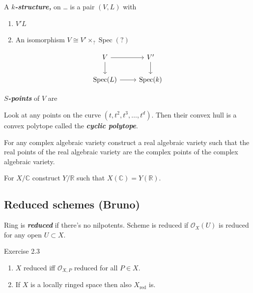 \begin{defn}\leavevmode
	A \textit{\textbf{$k$-structure,}} on … is a pair $(V,L)$ with
	 \begin{enumerate}
		\item $V'L$
	
		\item An isomorphism $V\cong V'\times_?\operatorname{Spec}(?)$
	\end{enumerate}
	\[\begin{tikzcd}
		V\arrow[r]\arrow[d]&V'\arrow[d]\\
		\operatorname{Spec}(L)\arrow[r]&\operatorname{Spec}(k)
	\end{tikzcd}\]
\end{defn}

\begin{defn}\leavevmode
	 \textit{\textbf{$S$-points}} of $V$ are 
\end{defn}

\begin{exercise}\leavevmode
	Look at any points on the curve $(t,t^2,t^3,\ldots,t^d)$. Then their convex hull is a convex polytope called the \textit{\textbf{cyclic polytope}}.
\end{exercise}

\begin{exercise}\leavevmode
	For any complex algebraic variety construct a real algebraic variety such that the real points of the real algebraic variety are the complex points of the complex algebraic variety.

	For $X/\mathbb{C}$ construct $Y/\mathbb{R}$ such that $X(\mathbb{C})=Y(\mathbb{R})$.
\end{exercise}

\subsection{Reduced schemes (Bruno)}


\begin{defn}\leavevmode
	Ring is \textit{\textbf{reduced}} if there's no nilpotents.  Scheme is reduced if  $\mathcal{O}_X(U)$ is reduced for any open $U\subset X$.
\end{defn}

\begin{thing5}{Exercise 2.3}\leavevmode
\begin{enumerate}[label=\alph*.]
	\item $X$ reduced iff $\mathcal{O}_{X,P}$ reduced for all $P\in X$.
	\item If $X$ is a locally ringed space then also $X_{\operatorname{red}}$ is.
\end{enumerate}	
\end{thing5}

